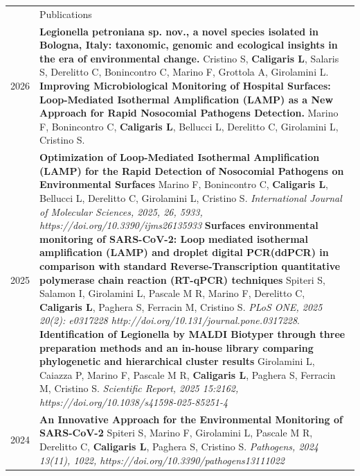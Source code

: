 \documentclass[letterpaper, 11pt]{article}
\newcommand{\headingfont}{\Large\color{OliveGreen}}
\newenvironment{SectionTable}[1]{
	\renewcommand*{\arraystretch}{1.7}
	\setlength{\tabcolsep}{10pt}
	\begin{longtable}{Rp{5.4in}} & #1 \\}
{\end{longtable}\vspace{-.3cm}}
\begin{document}
\begin{SectionTable}{\headingfont Publications}
2026 &
\textbf{Legionella petroniana sp. nov., a novel species isolated in Bologna, Italy: taxonomic, genomic and ecological insights in the era of environmental change.}\newline
Cristino S, \textbf{Caligaris L}, Salaris S, Derelitto C, Bonincontro C, Marino F, Grottola A, Girolamini L.\newline
\textbf{Improving Microbiological Monitoring of Hospital Surfaces: Loop-Mediated Isothermal Amplification (LAMP) as a New Approach for Rapid Nosocomial Pathogens Detection.}\newline
Marino F, Bonincontro C, \textbf{Caligaris L}, Bellucci L, Derelitto C, Girolamini L, Cristino S.\\
2025 & 
\textbf{Optimization of Loop-Mediated Isothermal Amplification (LAMP) for the Rapid Detection of Nosocomial Pathogens on Environmental Surfaces} \newline
Marino F, Bonincontro C, \textbf{Caligaris L}, Bellucci L, Derelitto C, Girolamini L, Cristino S. \newline
\textit{International Journal of Molecular Sciences, 2025, 26, 5933, https://doi.org/10.3390/ijms26135933} \newline
\textbf{Surfaces environmental monitoring of SARS-CoV-2: Loop mediated isothermal amplification (LAMP) and droplet digital PCR(ddPCR) in comparison with standard Reverse-Transcription quantitative polymerase chain reaction (RT-qPCR) techniques} \newline
Spiteri S, Salamon I, Girolamini L, Pascale M R, Marino F, Derelitto C, \textbf{Caligaris L}, Paghera S, Ferracin M, Cristino S. \newline
\textit{PLoS ONE, 2025 20(2): e0317228 http://doi.org/10.131/journal.pone.0317228}. \newline
\textbf{Identification of Legionella by MALDI Biotyper through three preparation methods and an in-house library comparing phylogenetic and hierarchical cluster results} \newline
Girolamini L, Caiazza P, Marino F, Pascale M R, \textbf{Caligaris L}, Paghera S, Ferracin M, Cristino S. \newline
\textit{Scientific Report, 2025 15:2162, https://doi.org/10.1038/s41598-025-85251-4} \\
2024 & 
\textbf{An Innovative Approach for the Environmental Monitoring of SARS-CoV-2} \newline
Spiteri S, Marino F, Girolamini L, Pascale M R, Derelitto C, \textbf{Caligaris L}, Paghera S, Cristino S. \newline
\textit{Pathogens, 2024 13(11), 1022, https://doi.org/10.3390/pathogens13111022} \\


\end{SectionTable}
\end{document}
